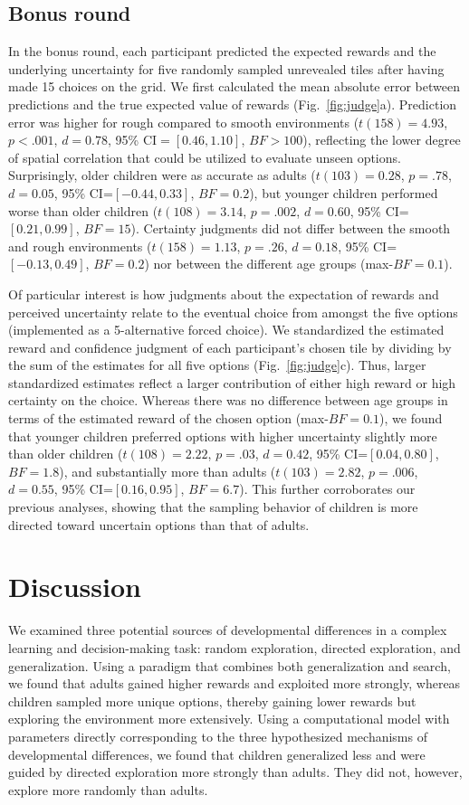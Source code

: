 \documentclass[a4paper,man, floatsintext, natbib]{apa6}
\begin{document}
\subsection{Bonus round}
In the bonus round, each participant predicted the expected rewards and the underlying uncertainty for five randomly sampled unrevealed tiles after having made 15 choices on the grid. We first calculated the mean absolute error between predictions and the true expected value of rewards (Fig.~\ref{fig:judge}a). Prediction error was higher for rough compared to smooth environments ($t(158)=4.93$, $p<.001$, $d=0.78$, 95\% CI$=[0.46, 1.10]$, $BF>100$), reflecting the lower degree of spatial correlation that could be utilized to evaluate unseen options. Surprisingly, older children were as accurate as adults ($t(103)=0.28$, $p=.78$, $d=0.05$, 95\% CI=$[-0.44, 0.33]$, $BF=0.2$), but younger children performed worse than older children ($t(108)=3.14$, $p=.002$, $d=0.60$, 95\% CI=$[0.21, 0.99]$, $BF=15$). Certainty judgments did not differ between the smooth and rough environments ($t(158)=1.13$, $p=.26$, $d=0.18$, 95\% CI=$[-0.13, 0.49]$, $BF=0.2$) nor between the different age groups (max-$BF=0.1$). 

Of particular interest is how judgments about the expectation of rewards and perceived uncertainty relate to the eventual choice from amongst the five options (implemented as a 5-alternative forced choice). We standardized the estimated reward and confidence judgment of each participant's chosen tile by dividing by the sum of the estimates for all five options (Fig.~\ref{fig:judge}c). Thus, larger standardized estimates reflect a larger contribution of either high reward or high certainty on the choice. Whereas there was no difference between age groups in terms of the estimated reward of the chosen option (max-$BF=0.1$), we found that younger children preferred options with higher uncertainty slightly more than older children ($t(108)=2.22$, $p=.03$, $d=0.42$, 95\% CI=$[0.04, 0.80]$, $BF=1.8$), and substantially more than adults ($t(103)=2.82$, $p=.006$, $d=0.55$, 95\% CI=$[0.16, 0.95]$, $BF=6.7$). This further corroborates our previous analyses, showing that the sampling behavior of children is more directed toward uncertain options than that of adults. 

\section*{Discussion}
We examined three potential sources of developmental differences in a complex learning and decision-making task: random exploration, directed exploration, and generalization. Using a paradigm that combines both generalization and search, we found that adults gained higher rewards and exploited more strongly, whereas children sampled more unique options, thereby gaining lower rewards but exploring the environment more extensively. Using a computational model with parameters directly corresponding to the three hypothesized mechanisms of developmental differences, we found that children generalized less and were guided by directed exploration more strongly than adults. They did not, however, explore more randomly than adults. 
\end{document}
